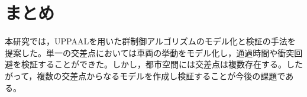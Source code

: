 \documentclass[10pt]{tpu-abst-utf}
\begin{document}
\section{まとめ}
本研究では，UPPAALを用いた群制御アルゴリズムのモデル化と検証の手法を提案した。単一の交差点においては車両の挙動をモデル化し，通過時間や衝突回避を検証することができた。しかし，都市空間には交差点は複数存在する。したがって，複数の交差点からなるモデルを作成し検証することが今後の課題である。
\begin{thebibliography}{1}
\end{thebibliography}
%
\end{document}
